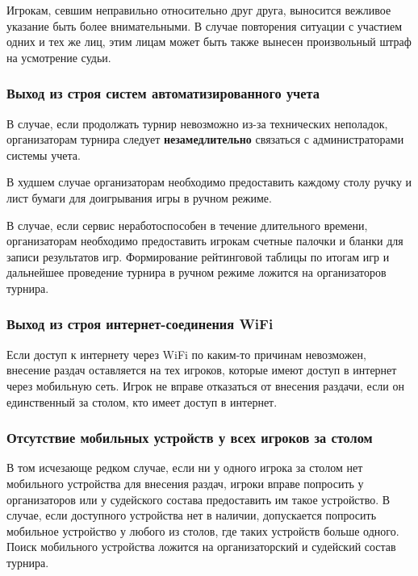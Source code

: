 Игрокам, севшим неправильно относительно друг друга, выносится вежливое указание быть более внимательными. В случае повторения ситуации с участием одних и тех же лиц, этим лицам может быть также вынесен произвольный штраф на усмотрение судьи.

\subsubsection{Выход из строя систем автоматизированного учета}

В случае, если продолжать турнир невозможно из-за технических неполадок, организаторам турнира следует \textbf{незамедлительно} связаться с администраторами системы учета. 

В худшем случае организаторам необходимо предоставить каждому столу ручку и лист бумаги для доигрывания игры в ручном режиме.

В случае, если сервис неработоспособен в течение длительного времени, организаторам необходимо предоставить игрокам счетные палочки и бланки для записи результатов игр. Формирование рейтинговой таблицы по итогам игр и дальнейшее проведение турнира в ручном режиме ложится на организаторов турнира.

\subsubsection{Выход из строя интернет-соединения WiFi}

Если доступ к интернету через WiFi по каким-то причинам невозможен, внесение раздач оставляется на тех игроков, которые имеют доступ в интернет через мобильную сеть. Игрок не вправе отказаться от внесения раздачи, если он единственный за столом, кто имеет доступ в интернет.

\subsubsection{Отсутствие мобильных устройств у всех игроков за столом}

В том исчезающе редком случае, если ни у одного игрока за столом нет мобильного устройства для внесения раздач, игроки вправе попросить у организаторов или у судейского состава предоставить им такое устройство. В случае, если доступного устройства нет в наличии, допускается попросить мобильное устройство у любого из столов, где таких устройств больше одного. Поиск мобильного устройства ложится на организаторский и судейский состав турнира.

